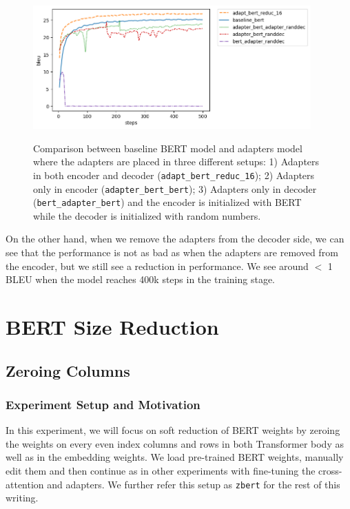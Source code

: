 \begin{figure}[h]
    {\includegraphics[width=0.95\textwidth]{img/adapter_bert_randdec.png}}
    \centering
    \caption{Comparison between baseline BERT model and adapters model where the adapters are placed in three different setups: 1) Adapters in both encoder and decoder (\texttt{adapt\_bert\_reduc\_16}); 2) Adapters only in encoder (\texttt{adapter\_bert\_bert}); 3) Adapters only in decoder (\texttt{bert\_adapter\_bert}) and the encoder is initialized with BERT while the decoder is initialized with random numbers.}
    \label{img:adapt_bert_randdec}
\end{figure}

On the other hand, when we remove the adapters from the decoder side, we can see that the performance is not as bad as when the adapters are removed from the encoder, but we still see a reduction in performance. We see around $<$ 1 BLEU when the model reaches 400k steps in the training stage.

\section{BERT Size Reduction}
\subsection{Zeroing Columns}
\subsubsection{Experiment Setup and Motivation}
In this experiment, we will focus on soft reduction of BERT weights by zeroing the weights on every even index columns and rows in both Transformer body as well as in the embedding weights. We load pre-trained BERT weights, manually edit them and then continue as in other experiments with fine-tuning the cross-attention and adapters. We further refer this setup as \texttt{zbert} for the rest of this writing.

